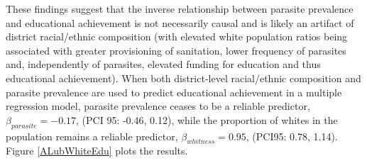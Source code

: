 \documentclass[12pt]{article}
\begin{document}
	These findings suggest that the inverse relationship between parasite prevalence and educational achievement is not necessarily causal and is likely an artifact of district racial/ethnic composition (with elevated white population ratios being associated with greater provisioning of sanitation, lower frequency of parasites and, independently of parasites, elevated funding for education and thus educational achievement). When both district-level racial/ethnic composition and parasite prevalence are used to predict educational achievement in a multiple regression model, parasite prevalence ceases to be a reliable predictor, $\beta_{parasite}=-0.17
$, (PCI 95: -0.46, 0.12), while the proportion of whites in the population remains a reliable predictor, $\beta_{whitness}=0.95$, (PCI95: 0.78, 1.14). Figure \ref{ALubWhiteEdu} plots the results.\\
\end{document}
